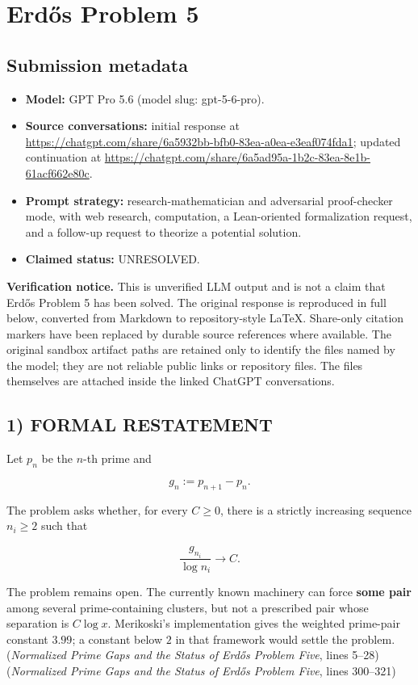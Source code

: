 \section*{Erd\H{o}s Problem 5}

\subsection*{Submission metadata}

\begin{itemize}
\item \textbf{Model:} GPT Pro 5.6 (model slug: gpt-5-6-pro).
\item \textbf{Source conversations:} initial response at \url{https://chatgpt.com/share/6a5932bb-bfb0-83ea-a0ea-e3eaf074fda1}; updated continuation at \url{https://chatgpt.com/share/6a5ad95a-1b2c-83ea-8e1b-61acf662e80c}.
\item \textbf{Prompt strategy:} research-mathematician and adversarial proof-checker mode, with web research, computation, a Lean-oriented formalization request, and a follow-up request to theorize a potential solution.
\item \textbf{Claimed status:} UNRESOLVED.
\end{itemize}

\noindent\textbf{Verification notice.}
This is unverified LLM output and is not a claim that Erd\H{o}s Problem 5 has been solved. The original response is reproduced in full below, converted from Markdown to repository-style LaTeX. Share-only citation markers have been replaced by durable source references where available. The original sandbox artifact paths are retained only to identify the files named by the model; they are not reliable public links or repository files. The files themselves are attached inside the linked ChatGPT conversations.

\medskip
\medskip

\subsection*{1) FORMAL RESTATEMENT}

Let \(p_n\) be the \(n\)-th prime and

\[
g_n:=p_{n+1}-p_n.
\]

The problem asks whether, for every \(C\ge 0\), there is a strictly increasing sequence \(n_i\ge2\) such that

\[
\frac{g_{n_i}}{\log n_i}\longrightarrow C.
\]

The problem remains open. The currently known machinery can force \textbf{some pair} among several prime-containing clusters, but not a prescribed pair whose separation is \(C\log x\). Merikoski’s implementation gives the weighted prime-pair constant \(3.99\); a constant below \(2\) in that framework would settle the problem. (\textit{Normalized Prime Gaps and the Status of Erd\H{o}s Problem Five}, lines 5--28) (\textit{Normalized Prime Gaps and the Status of Erd\H{o}s Problem Five}, lines 300--321)

